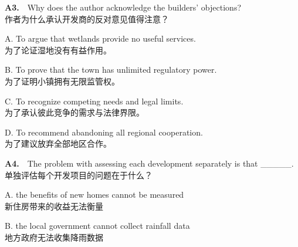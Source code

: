 \documentclass[a4paper,11pt,openany]{report}
\newcommand{\zhline}[1]{{\CJKsf\color{bodygrey}#1}}
\begin{document}
\begin{samepage}
\textbf{A3.}　Why does the author acknowledge the builders' objections?\\
\zhline{作者为什么承认开发商的反对意见值得注意？}
\par\end{samepage}

\begin{samepage}
A. To argue that wetlands provide no useful services.\\
\zhline{为了论证湿地没有有益作用。}
\par\end{samepage}

\begin{samepage}
B. To prove that the town has unlimited regulatory power.\\
\zhline{为了证明小镇拥有无限监管权。}
\par\end{samepage}

\begin{samepage}
C. To recognize competing needs and legal limits.\\
\zhline{为了承认彼此竞争的需求与法律界限。}
\par\end{samepage}

\begin{samepage}
D. To recommend abandoning all regional cooperation.\\
\zhline{为了建议放弃全部地区合作。}
\par\end{samepage}

\begin{samepage}
\textbf{A4.}　The problem with assessing each development separately is that \_\_\_\_\_.\\
\zhline{单独评估每个开发项目的问题在于什么？}
\par\end{samepage}

\begin{samepage}
A. the benefits of new homes cannot be measured\\
\zhline{新住房带来的收益无法衡量}
\par\end{samepage}

\begin{samepage}
B. the local government cannot collect rainfall data\\
\zhline{地方政府无法收集降雨数据}
\par\end{samepage}
\end{document}
